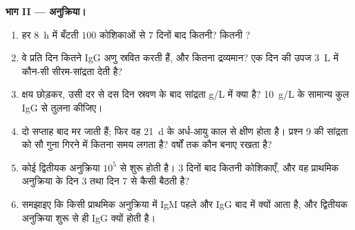 \begin{problem}
\medskip
\noindent\textbf{भाग II --- अनुक्रिया।}
\begin{enumerate}[resume]
  \item हर \qty{8}{h} में बँटती $100$ कोशिकाओं से $7$ दिनों बाद कितनी?
        कितनी ?
  \item वे प्रति दिन कितने IgG अणु स्रवित करती हैं, और कितना
        द्रव्यमान? एक दिन की उपज \qty{3}{L} में कौन-सी सीरम-सांद्रता
        देती है?
  \item क्षय छोड़कर, उसी दर से दस दिन स्रवण के बाद सांद्रता g/L में
        क्या है? \qty{10}{g/L} के सामान्य कुल IgG से तुलना कीजिए।
  \item {} दो सप्ताह बाद मर जाती हैं; फिर वह 
        \qty{21}{d} के अर्ध-आयु काल से क्षीण होता है। प्रश्न 9 की
        सांद्रता को सौ गुना गिरने में कितना समय लगता है? वर्षों तक
         कौन बनाए रखता है?
  \item कोई द्वितीयक अनुक्रिया $10^{5}$  से शुरू होती
        है। $3$ दिनों बाद कितनी कोशिकाएँ, और वह प्राथमिक अनुक्रिया के
        दिन 3 तथा दिन 7 से कैसी बैठती है?
  \item समझाइए कि किसी प्राथमिक अनुक्रिया में IgM पहले और IgG बाद में
        क्यों आता है, और द्वितीयक अनुक्रिया शुरू से ही IgG क्यों होती है।
\end{enumerate}


\end{problem}
